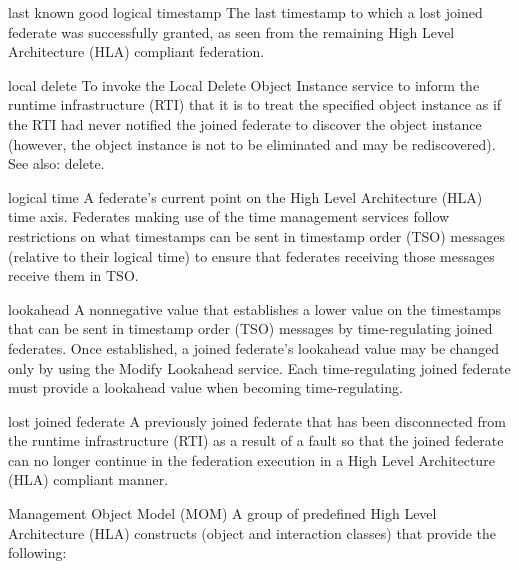 \begin{definition}{last known good logical timestamp}
    The last timestamp to which a lost joined federate was successfully granted, as seen from the remaining High Level Architecture (HLA) compliant federation.
\end{definition}

\begin{definition}{local delete}
    To invoke the Local Delete Object Instance service to inform the runtime infrastructure (RTI) that it is to treat the specified object instance as if the RTI had never notified the joined federate to discover the object instance (however, the object instance is not to be eliminated and may be rediscovered). See also: delete.
\end{definition}


\begin{definition}{logical time}
    A federate's current point on the High Level Architecture (HLA) time axis. Federates making use of the time management services follow restrictions on what timestamps can be sent in timestamp order (TSO) messages (relative to their logical time) to ensure that federates receiving those messages receive them in TSO.
\end{definition}

\begin{definition}{lookahead}
    A nonnegative value that establishes a lower value on the timestamps that can be sent in timestamp order (TSO) messages by time-regulating joined federates. Once established, a joined federate's lookahead value may be changed only by using the Modify Lookahead service. Each time-regulating joined federate must provide a lookahead value when becoming time-regulating.
\end{definition}

\begin{definition}{lost joined federate}
    A previously joined federate that has been disconnected from the runtime infrastructure (RTI) as a result of a fault so that the joined federate can no longer continue in the federation execution in a High Level Architecture (HLA) compliant manner.
\end{definition}

\begin{definition}{Management Object Model (MOM)}
    A group of predefined High Level Architecture (HLA) constructs (object and interaction classes) that provide the following:
\end{definition}

